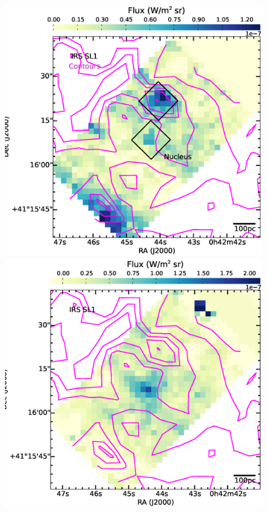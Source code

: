 

\begin{figure}
\centering
\includegraphics[scale = 0.25]{./fig13a.eps}
\includegraphics[scale = 0.25]{./fig13b.eps}

\end{figure}
